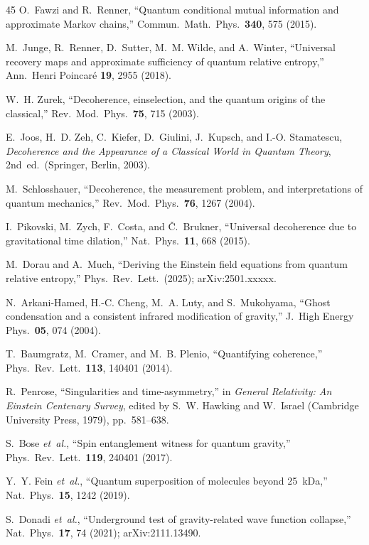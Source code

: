 \documentclass[prl,twocolumn,superscriptaddress,longbibliography,floatfix]{revtex4-2}
\begin{document}
\begin{thebibliography}{45}
O.~Fawzi and R.~Renner,
``Quantum conditional mutual information and approximate Markov
chains,''
Commun.\ Math.\ Phys.\ \textbf{340}, 575 (2015).

M.~Junge, R.~Renner, D.~Sutter, M.~M. Wilde, and A.~Winter,
``Universal recovery maps and approximate sufficiency of quantum
relative entropy,''
Ann.\ Henri Poincar\'{e} \textbf{19}, 2955 (2018).

W.~H. Zurek,
``Decoherence, einselection, and the quantum origins of the
classical,''
Rev.\ Mod.\ Phys.\ \textbf{75}, 715 (2003).

E.~Joos, H.~D. Zeh, C.~Kiefer, D.~Giulini, J.~Kupsch,
and I.-O. Stamatescu,
\emph{Decoherence and the Appearance of a Classical World in Quantum
Theory}, 2nd~ed.\ (Springer, Berlin, 2003).

M.~Schlosshauer,
``Decoherence, the measurement problem, and interpretations of
quantum mechanics,''
Rev.\ Mod.\ Phys.\ \textbf{76}, 1267 (2004).

I.~Pikovski, M.~Zych, F.~Costa, and \v{C}.~Brukner,
``Universal decoherence due to gravitational time dilation,''
Nat.\ Phys.\ \textbf{11}, 668 (2015).

M.~Dorau and A.~Much,
``Deriving the Einstein field equations from quantum relative
entropy,''
Phys.\ Rev.\ Lett.\ (2025); arXiv:2501.xxxxx.

N.~Arkani-Hamed, H.-C. Cheng, M.~A. Luty, and S.~Mukohyama,
``Ghost condensation and a consistent infrared modification of
gravity,''
J.\ High Energy Phys.\ \textbf{05}, 074 (2004).

T.~Baumgratz, M.~Cramer, and M.~B. Plenio,
``Quantifying coherence,''
Phys.\ Rev.\ Lett.\ \textbf{113}, 140401 (2014).

R.~Penrose,
``Singularities and time-asymmetry,'' in
\emph{General Relativity: An Einstein Centenary Survey},
edited by S.~W. Hawking and W.~Israel (Cambridge University Press,
1979), pp.~581--638.

S.~Bose \emph{et~al.},
``Spin entanglement witness for quantum gravity,''
Phys.\ Rev.\ Lett.\ \textbf{119}, 240401 (2017).

Y.~Y. Fein \emph{et~al.},
``Quantum superposition of molecules beyond 25~kDa,''
Nat.\ Phys.\ \textbf{15}, 1242 (2019).

S.~Donadi \emph{et~al.},
``Underground test of gravity-related wave function collapse,''
Nat.\ Phys.\ \textbf{17}, 74 (2021); arXiv:2111.13490.


\end{thebibliography}
\end{document}
